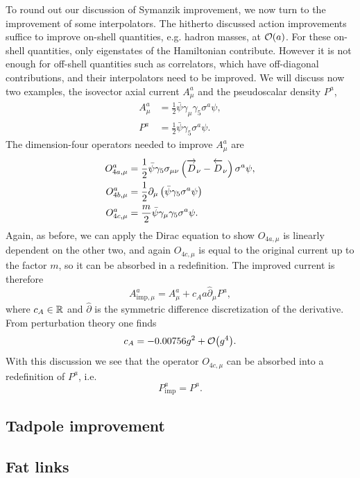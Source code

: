 To round out our discussion of Symanzik improvement, we now turn to the
improvement of some interpolators. The hitherto discussed action improvements
suffice to improve on-shell quantities, e.g. hadron masses, at $\order{a}$. 
For these on-shell quantities, only eigenstates of the Hamiltonian
contribute. However it is not enough for off-shell quantities such as
correlators, which have off-diagonal contributions, and their interpolators
need to be improved. We will discuss now two examples, the isovector axial
current $A_\mu^a$ and the pseudoscalar density $P^a$,
\begin{equation}\begin{aligned}
A_\mu^a&=\frac{1}{2}\bar{\psi}\gamma_\mu\gamma_5\sigma^a\psi,\\
P^a&=\frac{1}{2}\bar{\psi}\gamma_5\sigma^a\psi.
\end{aligned}\end{equation}
The dimension-four operators needed to improve $A_\mu^a$ are
\begin{equation}\begin{aligned}
  O_{4a,\mu}^a&=\frac{1}{2}\bar{\psi}\gamma_5\sigma_{\mu\nu}
                 \left(\overrightarrow{D\strut}_\nu-\overleftarrow{D\strut}_\nu\right)\sigma^a\psi,\\
  O_{4b,\mu}^a&=\frac{1}{2}\partial_\mu
                  \left(\bar{\psi}\gamma_5\sigma^a\psi\right)\\
  O_{4c,\mu}^a&=\frac{m}{2}\bar{\psi}\gamma_\mu\gamma_5\sigma^a\psi.
\end{aligned}\end{equation}
Again, as before, we can apply the Dirac equation to show $O_{4a,\mu}$ is
linearly dependent on the other two, and again $O_{4c,\mu}$ is equal to
the original current up to the factor $m$, so it can be absorbed
in a redefinition. The improved current is therefore
\begin{equation}
  A_{\text{imp},\mu}^a=A_\mu^a+c_A a\hat{\partial}_\mu P^a,
\end{equation}
where $c_A\in\mathbb{R}$ and $\hat{\partial}$ is the symmetric difference
discretization of the derivative. From perturbation theory one finds
\begin{equation}
  c_A=-0.00756g^2+\order{g^4}.
\end{equation}
With this discussion we see that the
operator $O_{4c,\mu}$ can be absorbed into a redefinition of $P^a$, i.e.
\begin{equation}
  P_\text{imp}^a=P^a.
\end{equation}

\subsection{Tadpole improvement}
\subsection{Fat links}





